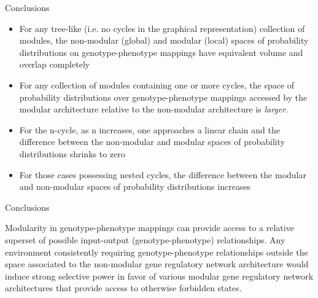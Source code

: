 \begin{frame}
\begin{block}{Conclusions}
\begin{small}
\begin{itemize}
\item For any tree-like (i.e. no cycles in the graphical representation) collection of modules, the non-modular (global) and modular (local) spaces of probability distributions on genotype-phenotype mappings have equivalent volume and overlap completely
\item For any collection of modules containing one or more cycles, the space of probability distributions over genotype-phenotype mappings accessed by the modular architecture relative to the non-modular architecture is \emph{larger}.
\item For the n-cycle, as n increases, one approaches a linear chain and the difference between the non-modular and modular spaces of probability distributions shrinks to zero
\item For those cases possessing nested cycles, the difference between the modular and non-modular spaces of probability distributions increases
\end{itemize}
\end{small}
\end{block}
\end{frame}

\begin{frame}
\begin{block}{Conclusions}
\begin{small}
Modularity in genotype-phenotype mappings can provide access to a relative superset of possible input-output (genotype-phenotype) relationships. Any environment consistently requiring genotype-phenotype relationships outside the space associated to the non-modular gene regulatory network architecture would induce strong selective power in favor of various modular gene regulatory network architectures that provide access to otherwise forbidden states.
\end{small}
\end{block}
\end{frame}

